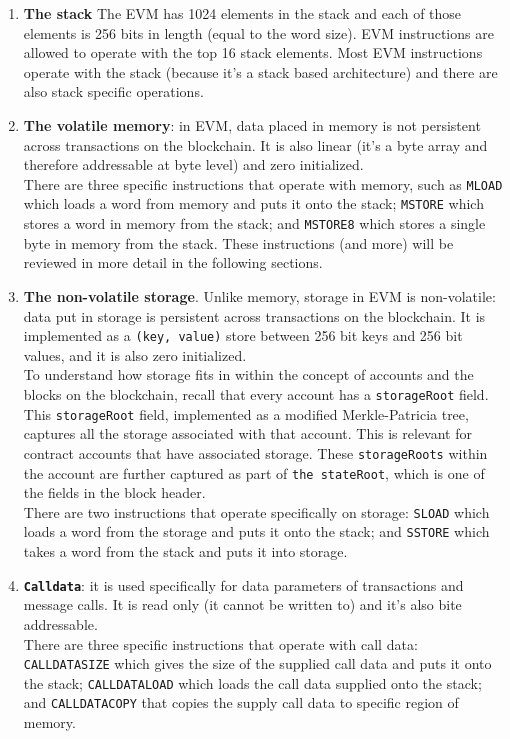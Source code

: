\begin{enumerate}
\def\labelenumi{\arabic{enumi}.}
\item
  \textbf{The stack} The EVM has 1024 elements in the stack and each of
  those elements is 256 bits in length (equal to the word size). EVM
  instructions are allowed to operate with the top 16 stack elements.
  Most EVM instructions operate with the stack (because it's a stack
  based architecture) and there are also stack specific operations.
\item
  \textbf{The volatile memory}: in EVM, data placed in memory is not
  persistent across transactions on the blockchain. It is also linear
  (it's a byte array and therefore addressable at byte level) and zero
  initialized.\\

  There are three specific instructions that operate with memory, such
  as \texttt{MLOAD} which loads a word from memory and puts it onto the
  stack; \texttt{MSTORE} which stores a word in memory from the stack;
  and \texttt{MSTORE8} which stores a single byte in memory from the
  stack. These instructions (and more) will be reviewed in more detail
  in the following sections.
\item
  \textbf{The non-volatile storage}. Unlike memory, storage in EVM is
  non-volatile: data put in storage is persistent across transactions on
  the blockchain. It is implemented as a \texttt{(key,\ value)} store
  between 256 bit keys and 256 bit values, and it is also zero
  initialized.\\

  To understand how storage fits in within the concept of accounts and
  the blocks on the blockchain, recall that every account has a
  \texttt{storageRoot} field. This \texttt{storageRoot} field,
  implemented as a modified Merkle-Patricia tree, captures all the
  storage associated with that account. This is relevant for contract
  accounts that have associated storage. These \texttt{storageRoots}
  within the account are further captured as part of
  \texttt{the\ stateRoot}, which is one of the fields in the block
  header.\\

  There are two instructions that operate specifically on storage:
  \texttt{SLOAD} which loads a word from the storage and puts it onto
  the stack; and \texttt{SSTORE} which takes a word from the stack and
  puts it into storage.
\item
  \textbf{\texttt{Calldata}}: it is used specifically for data
  parameters of transactions and message calls. It is read only (it
  cannot be written to) and it's also bite addressable.\\

  There are three specific instructions that operate with call data:
  \texttt{CALLDATASIZE} which gives the size of the supplied call data
  and puts it onto the stack; \texttt{CALLDATALOAD} which loads the call
  data supplied onto the stack; and \texttt{CALLDATACOPY} that copies
  the supply call data to specific region of memory.
\end{enumerate}

